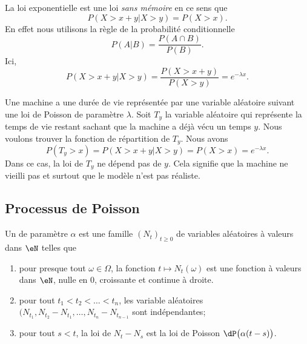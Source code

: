 La loi exponentielle est une loi \emph{sans mémoire} en ce sens que
\begin{equation}
    P(X>x+y|X>y)=P(X>x).
\end{equation}
En effet nous utilisons la règle de la probabilité conditionnelle
\begin{equation}
    P(A|B)=\frac{ P(A\cap B) }{ P(B) }.
\end{equation}
Ici,
\begin{equation}
    P(X>x+y|X>y)=\frac{ P(X>x+y) }{ P(X>y) }= e^{-\lambda x}.
\end{equation}

\begin{example}
    Une machine a une durée de vie représentée par une variable aléatoire suivant une loi de Poisson de paramètre \( \lambda\). Soit \( T_y\) la variable aléatoire qui représente la temps de vie restant sachant que la machine a déjà vécu un temps \( y\). Nous voulons trouver la fonction de répartition de \( T_y\). Nous avons
    \begin{equation}
        P(T_y>x)=P(X>x+y|X>y)=P(X>x)= e^{-\lambda x}.
    \end{equation}
    Dans ce cas, la loi de \( T_y\) ne dépend pas de \( y\). Cela signifie que la machine ne vieilli pas et surtout que le modèle n'est pas réaliste.
\end{example}



\subsection{Processus de Poisson}
\label{SubsecHxbtzQ}

Un  de paramètre \( \alpha\) est une famille \( (N_t)_{t\geq 0}\) de variables aléatoires à valeurs dans \( \eN\) telles que
\begin{enumerate}
    \item
        pour presque tout \( \omega\in \Omega\), la fonction \( t\mapsto N_t(\omega)\) est une fonction à valeurs dans \( \eN\), nulle en \( 0\), croissante et continue à droite.
    \item
        pour tout \( t_1<t_2<\ldots<t_n\), les variable aléatoires \( (N_{t_1}, N_{t_2}-N_{t_1},\ldots, N_{t_n}-N_{t_{n-1}}\) sont indépendantes;
    \item
        pour tout \( s<t\), la loi de \( N_t-N_s\) est la loi de Poisson \( \dP\big( \alpha(t-s) \big)\).
\end{enumerate}

